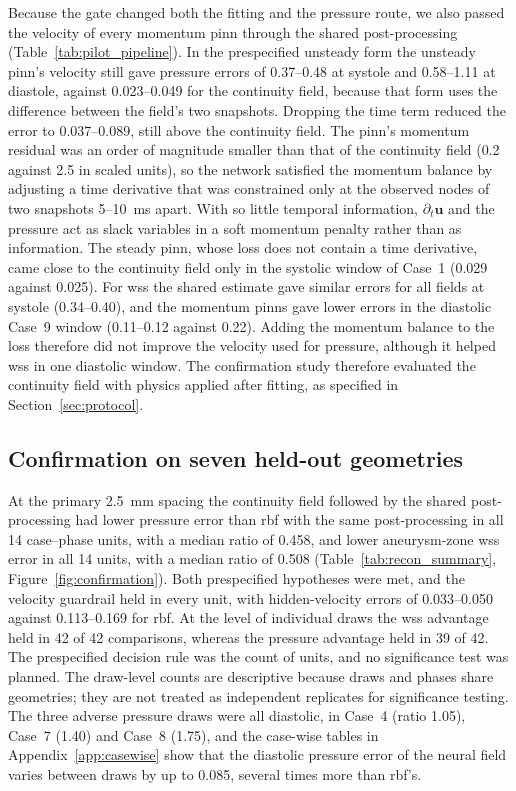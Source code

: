 \documentclass[12pt,a4paper]{article}
\newcommand{\PINN}{\ac{pinn}\xspace}
\newcommand{\PINNs}{\acp{pinn}\xspace}
\newcommand{\WSS}{\ac{wss}\xspace}
\newcommand{\RBF}{\ac{rbf}\xspace}
\theoremstyle{definition}
\numberwithin{equation}{section}
\begin{document}
Because the gate changed both the fitting and the pressure route, we also passed the velocity of every momentum \PINN through the shared post-processing (Table~\ref{tab:pilot_pipeline}). In the prespecified unsteady form the unsteady \PINN's velocity still gave pressure errors of 0.37--0.48 at systole and 0.58--1.11 at diastole, against 0.023--0.049 for the continuity field, because that form uses the difference between the field's two snapshots. Dropping the time term reduced the error to 0.037--0.089, still above the continuity field. The \PINN's momentum residual was an order of magnitude smaller than that of the continuity field (0.2 against 2.5 in scaled units), so the network satisfied the momentum balance by adjusting a time derivative that was constrained only at the observed nodes of two snapshots 5--10~ms apart. With so little temporal information, $\partial_t\mathbf u$ and the pressure act as slack variables in a soft momentum penalty rather than as information. The steady \PINN, whose loss does not contain a time derivative, came close to the continuity field only in the systolic window of Case~1 (0.029 against 0.025). For \WSS the shared estimate gave similar errors for all fields at systole (0.34--0.40), and the momentum \PINNs gave lower errors in the diastolic Case~9 window (0.11--0.12 against 0.22). Adding the momentum balance to the loss therefore did not improve the velocity used for pressure, although it helped \WSS in one diastolic window. The confirmation study therefore evaluated the continuity field with physics applied after fitting, as specified in Section~\ref{sec:protocol}.





\subsection{Confirmation on seven held-out geometries}
\label{sec:confirmation}
At the primary 2.5~mm spacing the continuity field followed by the shared post-processing had lower pressure error than \RBF with the same post-processing in all 14 case--phase units, with a median ratio of 0.458, and lower aneurysm-zone \WSS error in all 14 units, with a median ratio of 0.508 (Table~\ref{tab:recon_summary}, Figure~\ref{fig:confirmation}). Both prespecified hypotheses were met, and the velocity guardrail held in every unit, with hidden-velocity errors of 0.033--0.050 against 0.113--0.169 for \RBF. At the level of individual draws the \WSS advantage held in 42 of 42 comparisons, whereas the pressure advantage held in 39 of 42. The prespecified decision rule was the count of units, and no significance test was planned. The draw-level counts are descriptive because draws and phases share geometries; they are not treated as independent replicates for significance testing. The three adverse pressure draws were all diastolic, in Case~4 (ratio 1.05), Case~7 (1.40) and Case~8 (1.75), and the case-wise tables in Appendix~\ref{app:casewise} show that the diastolic pressure error of the neural field varies between draws by up to 0.085, several times more than \RBF's.
\end{document}
